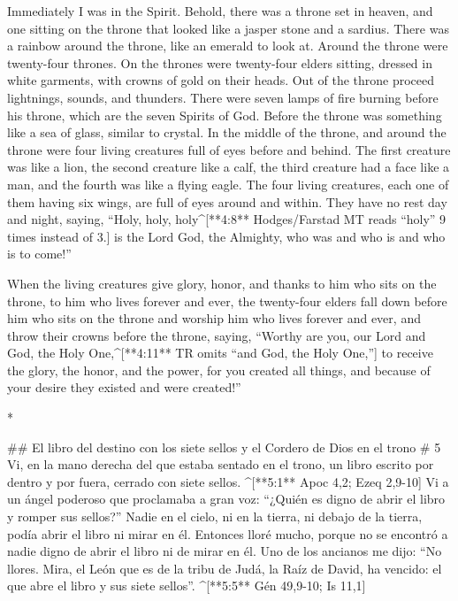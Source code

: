 \begin{paracols}{2}
\begin{english}
 Immediately I was in the Spirit. Behold, there was a throne set in heaven, and one sitting on the throne  that looked like a jasper stone and a sardius. There was a rainbow around the throne, like an emerald to look at.  Around the throne were twenty-four thrones. On the thrones were twenty-four elders sitting, dressed in white garments, with crowns of gold on their heads.  Out of the throne proceed lightnings, sounds, and thunders. There were seven lamps of fire burning before his throne, which are the seven Spirits of God.  Before the throne was something like a sea of glass, similar to crystal. In the middle of the throne, and around the throne were four living creatures full of eyes before and behind.  The first creature was like a lion, the second creature like a calf, the third creature had a face like a man, and the fourth was like a flying eagle.  The four living creatures, each one of them having six wings, are full of eyes around and within. They have no rest day and night, saying, “Holy, holy, holy^[**4:8** Hodges/Farstad MT reads “holy” 9 times instead of 3.] is the Lord God, the Almighty, who was and who is and who is to come!” 

 When the living creatures give glory, honor, and thanks to him who sits on the throne, to him who lives forever and ever,  the twenty-four elders fall down before him who sits on the throne and worship him who lives forever and ever, and throw their crowns before the throne, saying,  “Worthy are you, our Lord and God, the Holy One,^[**4:11** TR omits “and God, the Holy One,”] to receive the glory, the honor, and the power, for you created all things, and because of your desire they existed and were created!”

\end{english}
\switchcolumn[0]*

## El libro del destino con los siete sellos y el Cordero de Dios en el trono
# 5
 Vi, en la mano derecha del que estaba sentado en el trono, un libro escrito por dentro y por fuera, cerrado con siete sellos. ^[**5:1** Apoc 4,2; Ezeq 2,9-10]  Vi a un ángel poderoso que proclamaba a gran voz: “¿Quién es digno de abrir el libro y romper sus sellos?”  Nadie en el cielo, ni en la tierra, ni debajo de la tierra, podía abrir el libro ni mirar en él.  Entonces lloré mucho, porque no se encontró a nadie digno de abrir el libro ni de mirar en él.  Uno de los ancianos me dijo: “No llores. Mira, el León que es de la tribu de Judá, la Raíz de David, ha vencido: el que abre el libro y sus siete sellos”. ^[**5:5** Gén 49,9-10; Is 11,1]


\end{paracols}
